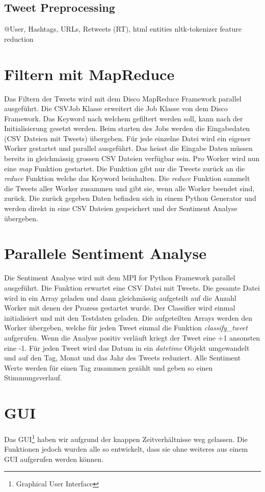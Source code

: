 \documentclass[12pt, oneside]{report}   	%
\begin{document}
\subsection{Tweet Preprocessing}
@User, Hashtags, URLs, Retweets (RT), html entities
nltk-tokenizer
feature reduction

\section{Filtern mit MapReduce}
Das Filtern der Tweets wird mit dem Disco MapReduce Framework parallel ausgeführt. Die CSVJob Klasse erweitert die Job Klasse von dem Disco Framework. Das Keyword nach welchem gefiltert werden soll, kann nach der Initialisierung gesetzt werden. Beim starten des Jobs werden die Eingabedaten (CSV Dateien mit Tweets) übergeben. Für jede einzelne Datei wird ein eigener Worker gestartet und parallel ausgeführt. Das heisst die Eingabe Daten müssen bereits in gleichmässig grossen CSV Dateien verfügbar sein. Pro Worker wird nun eine \emph{map} Funktion gestartet. Die Funktion gibt nur die Tweets zurück an die \emph{reduce} Funktion welche das Keyword beinhalten. Die \emph{reduce} Funktion sammelt die Tweets aller Worker zusammen und gibt sie, wenn alle Worker beendet sind, zurück. Die zurück gegeben Daten befinden sich in einem Python Generator und werden direkt in eine CSV Dateien gespeichert und der Sentiment Analyse übergeben.

\section{Parallele Sentiment Analyse}
Die Sentiment Analyse wird mit dem MPI for Python Framework parallel ausgeführt. Die Funktion erwartet eine CSV Datei mit Tweets. Die gesamte Datei wird in ein Array geladen und dann gleichmässig aufgeteilt auf die Anzahl Worker mit denen der Prozess gestartet wurde. Der Classifier wird einmal initialisiert und mit den Testdaten geladen. Die aufgeteilten Arrays werden den Worker übergeben, welche für jeden Tweet einmal die Funktion \emph{classify\_tweet} aufgerufen. Wenn die Analyse positiv verläuft kriegt der Tweet eine +1 ansonsten eine -1. \newline{} 
%
Für jeden Tweet wird das Datum in ein \emph{datetime} Objekt umgewandelt und auf den Tag, Monat und das Jahr des Tweets reduziert. Alle Sentiment Werte werden für einen Tag zusammen gezählt und geben so einen Stimmungsverlauf.

\section{GUI}
Das GUI\footnote{Graphical User Interface} haben wir aufgrund der knappen Zeitverhältnisse weg gelassen. Die Funktionen jedoch wurden alle so entwickelt, dass sie ohne weiteres aus einem GUI aufgerufen werden können.
\end{document}
